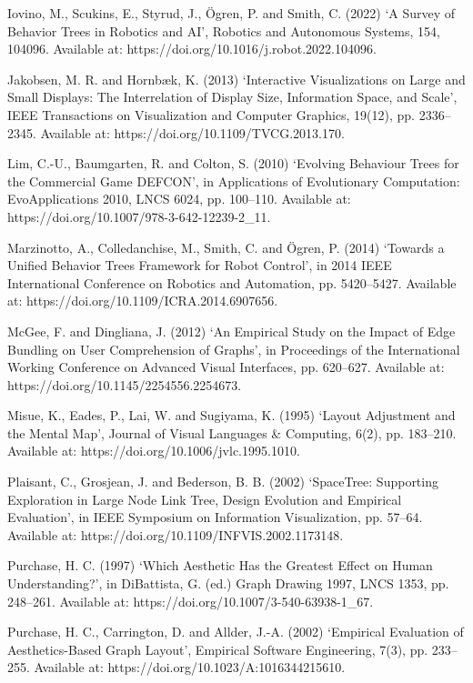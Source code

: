 \documentclass[11pt,a4paper,oneside,extrafontsizes]{memoir}
\begin{document}
Iovino, M., Scukins, E., Styrud, J., Ögren, P. and Smith, C. (2022) ‘A Survey of Behavior Trees in Robotics and AI’, Robotics and Autonomous Systems, 154, 104096. Available at: https://doi.org/10.1016/j.robot.2022.104096.

Jakobsen, M. R. and Hornbæk, K. (2013) ‘Interactive Visualizations on Large and Small Displays: The Interrelation of Display Size, Information Space, and Scale’, IEEE Transactions on Visualization and Computer Graphics, 19(12), pp. 2336–2345. Available at: https://doi.org/10.1109/TVCG.2013.170.

Lim, C.-U., Baumgarten, R. and Colton, S. (2010) ‘Evolving Behaviour Trees for the Commercial Game DEFCON’, in Applications of Evolutionary Computation: EvoApplications 2010, LNCS 6024, pp. 100–110. Available at: https://doi.org/10.1007/978-3-642-12239-2\_11.

Marzinotto, A., Colledanchise, M., Smith, C. and Ögren, P. (2014) ‘Towards a Unified Behavior Trees Framework for Robot Control’, in 2014 IEEE International Conference on Robotics and Automation, pp. 5420–5427. Available at: https://doi.org/10.1109/ICRA.2014.6907656.

McGee, F. and Dingliana, J. (2012) ‘An Empirical Study on the Impact of Edge Bundling on User Comprehension of Graphs’, in Proceedings of the International Working Conference on Advanced Visual Interfaces, pp. 620–627. Available at: https://doi.org/10.1145/2254556.2254673.

Misue, K., Eades, P., Lai, W. and Sugiyama, K. (1995) ‘Layout Adjustment and the Mental Map’, Journal of Visual Languages \& Computing, 6(2), pp. 183–210. Available at: https://doi.org/10.1006/jvlc.1995.1010.

Plaisant, C., Grosjean, J. and Bederson, B. B. (2002) ‘SpaceTree: Supporting Exploration in Large Node Link Tree, Design Evolution and Empirical Evaluation’, in IEEE Symposium on Information Visualization, pp. 57–64. Available at: https://doi.org/10.1109/INFVIS.2002.1173148.

Purchase, H. C. (1997) ‘Which Aesthetic Has the Greatest Effect on Human Understanding?’, in DiBattista, G. (ed.) Graph Drawing 1997, LNCS 1353, pp. 248–261. Available at: https://doi.org/10.1007/3-540-63938-1\_67.

Purchase, H. C., Carrington, D. and Allder, J.-A. (2002) ‘Empirical Evaluation of Aesthetics-Based Graph Layout’, Empirical Software Engineering, 7(3), pp. 233–255. Available at: https://doi.org/10.1023/A:1016344215610.
\end{document}
